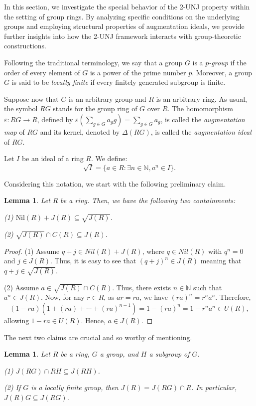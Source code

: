 \documentclass[12pt]{amsart}
\newtheorem{lemma}[theorem]{Lemma}
\theoremstyle{definition}
\begin{document}
In this section, we investigate the special behavior of the 2-UNJ property within the setting of group rings. By analyzing specific conditions on the underlying groups and employing structural properties of augmentation ideals, we provide further insights into how the 2-UNJ framework interacts with group-theoretic constructions.

Following the traditional terminology, we say that a group $G$ is a {\it $p$-group} if the order of every element of $G$ is a power of the prime number $p$. Moreover, a group $G$ is said to be {\it locally finite} if every finitely generated subgroup is finite.

Suppose now that $G$ is an arbitrary group and $R$ is an arbitrary ring. As usual, the symbol $RG$ stands for the group ring of $G$ over $R$. The homomorphism $\varepsilon :RG\rightarrow R$, defined by $\varepsilon (\displaystyle\sum_{g\in G}a_{g}g)=\displaystyle\sum_{g\in G}a_{g}$, is called the {\it augmentation map} of $RG$ and its kernel, denoted by $\Delta (RG)$, is called the {\it augmentation ideal} of $RG$.

Let $I$ be an ideal of a ring $R$. We define:
\[
\sqrt{I} = \{a \in R : \exists n \in \mathbb{N}, a^n \in I\}.
\]

Considering this notation, we start with the following preliminary claim.

\begin{lemma}
Let R be a ring. Then, we have the following two containments:

(1)  $\text{Nil}(R) + J(R) \subseteq \sqrt{J(R)}$.

(2)  $\sqrt{J(R)} \cap C(R) \subseteq J(R)$.
\end{lemma}

\begin{proof}
(1) Assume $q + j \in Nil(R) + J(R)$, where $q \in Nil(R)$ with $q^n = 0$ and $j \in J(R)$. Thus, it is easy to see that $(q + j)^n \in J(R)$ meaning that $q + j \in \sqrt{J(R)}$.

(2) Assume $a \in \sqrt{J(R)} \cap C(R)$. Thus, there exists $n \in \mathbb{N}$ such that $a^n \in J(R)$. Now, for any $r \in R$, as $ar = ra$, we have $(ra)^n = r^n a^n$. Therefore,
\[
(1 - ra)(1 + (ra) + \cdots + (ra)^{n-1}) = 1 - (ra)^n = 1 - r^n a^n \in U(R),
\]
allowing $1 - ra \in U(R)$. Hence, $a \in J(R)$.
\end{proof}

The next two claims are crucial and so worthy of mentioning.

\begin{lemma}\cite[Proposition 9]{coon}\label{ext le}
Let $R$ be a ring, $G$ a group, and $H$ a subgroup of $G$. 

(1) $J(RG) \cap RH \subseteq J(RH)$.

(2) If $G$ is a locally finite group, then $J(R) = J(RG) \cap R$. In particular, $J(R)G \subseteq J(RG)$.
\end{lemma}
\end{document}
